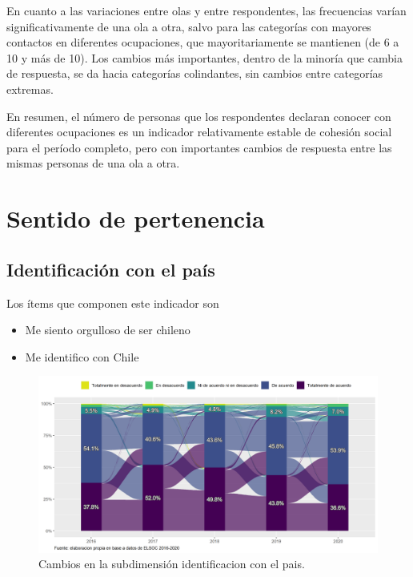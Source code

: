 \documentclass[
  12pt,
]{book}
\begin{document}
En cuanto a las variaciones entre olas y entre respondentes, las frecuencias varían significativamente de una ola a otra, salvo para las categorías con mayores contactos en diferentes ocupaciones, que mayoritariamente se mantienen (de 6 a 10 y más de 10). Los cambios más importantes, dentro de la minoría que cambia de respuesta, se da hacia categorías colindantes, sin cambios entre categorías extremas.

En resumen, el número de personas que los respondentes declaran conocer con diferentes ocupaciones es un indicador relativamente estable de cohesión social para el período completo, pero con importantes cambios de respuesta entre las mismas personas de una ola a otra.

\hypertarget{sentido-de-pertenencia-1}{%
\section{Sentido de pertenencia}\label{sentido-de-pertenencia-1}}

\hypertarget{identificaciuxf3n-con-el-pauxeds}{%
\subsection{Identificación con el país}\label{identificaciuxf3n-con-el-pauxeds}}

Los ítems que componen este indicador son

\begin{itemize}
\item
  Me siento orgulloso de ser chileno
\item
  Me identifico con Chile
\end{itemize}

\begin{figure}[H]

{\centering \includegraphics[width=1\linewidth,height=1\textheight]{output/graphs/alluvial_identificacion} 

}

\caption{Cambios en la subdimensión identificacion con el pais.}\label{fig:alluvial-identificacion}
\end{figure}
\end{document}
